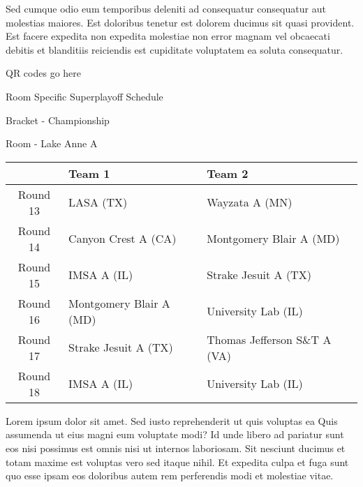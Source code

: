 \documentclass{article}%
\begin{document}
\newline%
Sed cumque odio eum temporibus deleniti ad consequatur consequatur aut molestias maiores. Est doloribus tenetur est dolorem ducimus sit quasi provident. Est facere expedita non expedita molestiae non error magnam vel obcaecati debitis et blanditiis reiciendis est cupiditate voluptatem ea soluta consequatur.%
\vspace*{140pt}%
\begin{center}%
\begin{Huge}%
QR codes go here%
\end{Huge}%
\end{center}%
\newpage%
\begin{center}%
\begin{Huge}%
Room Specific Superplayoff Schedule%
\end{Huge}%
\vspace*{8pt}%
\linebreak%
\begin{Large}%
Bracket {-} Championship%
\end{Large}%
\vspace*{8pt}%
\linebreak%
\vspace*{8pt}%
\begin{Large}%
Room {-} Lake Anne A%
\end{Large}%
\end{center}%
%
\begin{tabularx}{\textwidth}{|c|Y|Y|}%
\hline%
&Team 1&Team 2\\%
\hline%
Round 13&LASA (TX)&Wayzata A (MN)\\%
Round 14&Canyon Crest A (CA)&Montgomery Blair A (MD)\\%
Round 15&IMSA A (IL)&Strake Jesuit A (TX)\\%
Round 16&Montgomery Blair A (MD)&University Lab (IL)\\%
Round 17&Strake Jesuit A (TX)&Thomas Jefferson S\&T A (VA)\\%
Round 18&IMSA A (IL)&University Lab (IL)\\%
\hline%
\end{tabularx}%
\vspace*{8pt}%
\newline%
Lorem ipsum dolor sit amet. Sed iusto reprehenderit ut quis voluptas ea Quis assumenda ut eius magni eum voluptate modi? Id unde libero ad pariatur sunt eos nisi possimus est omnis nisi ut internos laboriosam. Sit nesciunt ducimus et totam maxime est voluptas vero sed itaque nihil. Et expedita culpa et fuga sunt quo esse ipsam eos doloribus autem rem perferendis modi et molestiae vitae.\newline%
\end{document}
